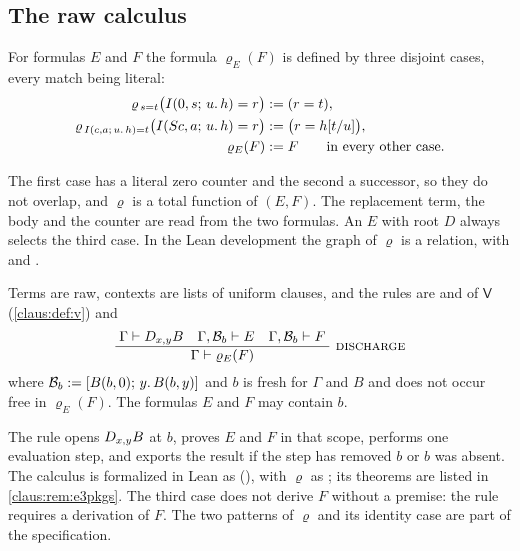 \subsection{The raw calculus}

\begin{definition}
\label{claus:def:rho}
For formulas $E$ and $F$ the formula $\varrho_E(F)$ is defined by three
disjoint cases, every match being literal:
\begin{align*}
 \varrho_{\,s=t}\bigl(I(0,s;\,u.\,h)=r\bigr)&\mathrel{:=}(r=t),\\
 \varrho_{\,I(c,a;\,u.\,h)=t}\bigl(I(S c,a;\,u.\,h)=r\bigr)
   &\mathrel{:=}\bigl(r=h[t/u]\bigr),\\
 \varrho_E(F)&\mathrel{:=} F\qquad\text{in every other case.}
\end{align*}
\end{definition}

The first case has a literal zero counter and the second a successor, so
they do not overlap, and $\varrho$ is a total function of $(E,F)$. The
replacement term, the body and the counter are read from the two
formulas. An $E$ with root $D$ always selects the third case. In the Lean
development the graph of $\varrho$ is a relation, with
 and .

\begin{definition}
\label{claus:def:e3}
Terms are raw, contexts are lists of uniform clauses, and the rules are
 and  of $\mathsf{V}$
(\cref{claus:def:v}) and
\[
 \infrule{\Gamma\proves\D{x}{y}B\quad
          \Gamma,\mathcal{B}_b\proves E\quad
          \Gamma,\mathcal{B}_b\proves F}
         {\Gamma\proves\varrho_E(F)}\ \rulename{Discharge}
\]
where $\mathcal{B}_b\mathrel{:=}[B(b,0);\,y.\,B(b,y)]$ and $b$ is fresh for $\Gamma$ and $B$ and does not occur free in
$\varrho_E(F)$. The formulas $E$ and $F$ may contain $b$.
\end{definition}

The rule opens $D_{x,y}B$ at $b$, proves $E$ and $F$ in that scope,
performs one evaluation step, and exports the result if the step has
removed $b$ or $b$ was absent. The calculus is formalized in Lean as
 (), with $\varrho$ as ;
its theorems are listed in \cref{claus:rem:e3pkgs}. The third case does not derive $F$ without
a premise: the rule requires a derivation of $F$. The two patterns of
$\varrho$ and its identity case are part of the specification.

